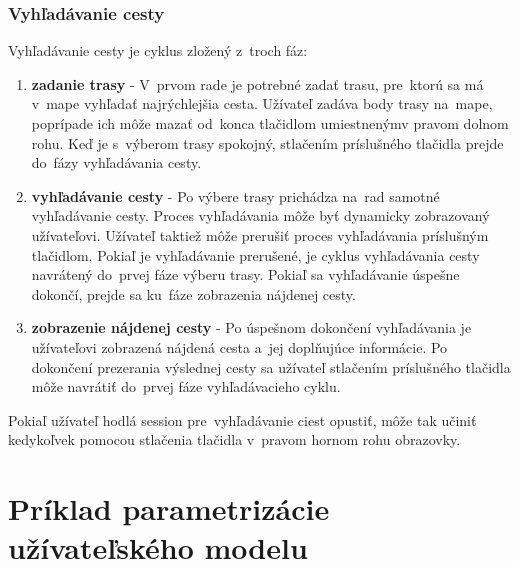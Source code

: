 \documentclass[12pt,a4paper]{report}
\begin{document}
\subsubsection{Vyhľadávanie cesty}

\begin{figure}[h]\centering
{}
\end{figure}

Vyhľadávanie cesty je cyklus zložený z~troch fáz:
\begin{enumerate}
    \item \textbf{zadanie trasy} - V~prvom rade je potrebné zadať trasu, pre~ktorú sa má v~mape vyhľadať najrýchlejšia cesta. Užívateľ zadáva body trasy na~mape, poprípade ich môže mazať od~konca tlačidlom umiestnenýmv pravom dolnom rohu. Keď je s~výberom trasy spokojný, stlačením príslušného tlačidla prejde do~fázy vyhľadávania cesty.
    \item \textbf{vyhľadávanie cesty} - Po výbere trasy prichádza na~rad samotné vyhľadávanie cesty. Proces vyhľadávania môže byť dynamicky zobrazovaný užívateľovi. Užívateľ taktiež môže prerušiť proces vyhľadávania príslušným tlačidlom. Pokiaľ je vyhľadávanie prerušené, je cyklus vyhľadávania cesty navrátený do~prvej fáze výberu trasy. Pokiaľ sa vyhľadávanie úspešne dokončí, prejde sa ku~fáze zobrazenia nájdenej cesty.
    \item \textbf{zobrazenie nájdenej cesty} - Po úspešnom dokončení vyhľadávania je užívateľovi zobrazená nájdená cesta a~jej doplňujúce informácie. Po dokončení prezerania výslednej cesty sa užívateľ stlačením príslušného tlačidla môže navrátiť do~prvej fáze vyhľadávacieho cyklu.
\end{enumerate}

Pokiaľ užívateľ hodlá session pre~vyhľadávanie ciest opustiť, môže tak učiniť kedykoľvek pomocou stlačenia tlačidla v~pravom hornom rohu obrazovky. 

\section{Príklad parametrizácie užívateľského modelu}\label{uzivatelsky_model}
\end{document}
